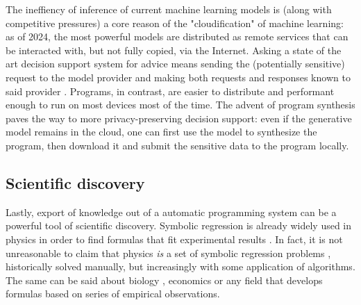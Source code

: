 The ineffiency of inference of current machine learning models is (along with competitive pressures) a core reason of the "cloudification" of machine learning: as of 2024, the most powerful models \cite{achiamGpt4TechnicalReport2023} are distributed as remote services that can be interacted with, but not fully copied, via the Internet.
Asking a state of the art decision support system for advice means sending the (potentially sensitive) request to the model provider and making both requests and responses known to said provider \cite{PrivacyPolicy}.
Programs, in contrast, are easier to distribute and performant enough to run on most devices most of the time.
The advent of program synthesis paves the way to more privacy-preserving decision support: even if the generative model remains in the cloud, one can first use the model to synthesize the program, then download it and submit the sensitive data to the program locally.

\subsection{Scientific discovery}
\label{sec:scientific-discovery}

Lastly, export of knowledge out of a automatic programming system can be a powerful tool of scientific discovery. 
Symbolic regression is already widely used in physics in order to find formulas that fit experimental results \cite{angelisArtificialIntelligencePhysical2023, tenachiDeepSymbolicRegression2023}. 
In fact, it is not unreasonable to claim that physics \emph{is} a set of symbolic regression problems \cite{udrescuAIFeynmanPhysicsinspired2020}, historically solved manually, but increasingly with some application of algorithms. 
The same can be said about biology \cite{chenRevealingComplexEcological2019}, economics \cite{claveriaAssessmentEffectFinancial2017, lianModelingForecastingPassenger2018, panInfluentialFactorsCarbon2019, truscottDetectingShadowEconomy2011, truscottExplainingUnemploymentRates2014, yamashitaCustomizedPredictionAttendance2022} or any field that develops formulas based on series of empirical observations.
